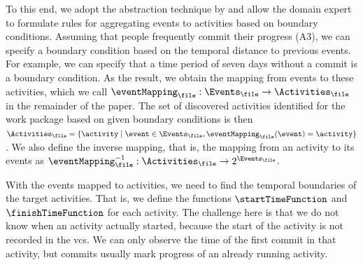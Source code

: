 To this end, we adopt the abstraction technique by \citep{baier2014bridging} and allow the domain expert to formulate rules for aggregating events to activities based on boundary conditions. Assuming that people frequently commit their progress (A3), we can specify a boundary condition based on the temporal distance to previous events. For example, we can specify that a time period of seven days without a commit is a boundary condition. %
As the result, we obtain the mapping from events to these activities, which we call $\eventMapping_{\file} : \Events_{\file} \rightarrow \Activities_{\file}$ in the remainder of the paper. The set of discovered activities identified for the work package based on given boundary conditions is then $\Activities_{\file} = \lbrace \activity \mid \event \in \Events_{\file}, \eventMapping_{\file}(\event) = \activity \rbrace$. We also define the inverse mapping, that is, the mapping from an activity to its events as $\eventMapping_{\file}^{-1} : \Activities_{\file} \rightarrow 2^{\Events_{\file}}$.

With the events mapped to activities, we need to find the temporal boundaries of the target activities. That is, we define the functions $\startTimeFunction$ and $\finishTimeFunction$ for each activity. The challenge here is that we do not know when an activity actually started, because the start of the activity is not recorded in the \gls{vcs}. We can only observe the time of the first commit in that activity, but commits usually mark progress of an already running activity.

